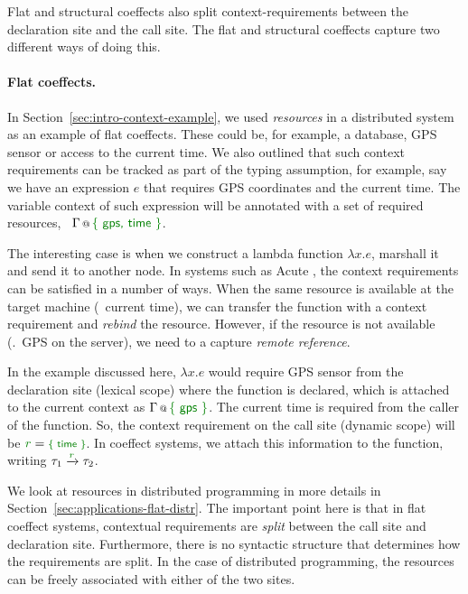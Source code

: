 Flat and structural coeffects also split context-requirements between the declaration site and 
the call site. The flat and structural coeffects capture two different ways of doing this.

\paragraph{Flat coeffects.}

In Section~\ref{sec:intro-context-example}, we used \emph{resources} in a distributed system as an 
example of flat coeffects. These could be, for example, a database, GPS sensor or access to the current 
time. We also outlined that such context requirements can be tracked as part of the typing assumption,
for example, say we have an expression $e$ that requires GPS coordinates and the current time. 
The variable context of such expression will be annotated with a set of required resources, 
\ie~$\coctx{\Gamma}{ \cclrd{\ident{\{ gps, time \}}} }$.

The interesting case is when we construct a lambda function $\lambda x.e$, marshall it and
send it to another node. In systems such as Acute \cite{app-distributed-acute}, the context 
requirements can be satisfied in a number of ways. When the same resource is available at the target
machine (\eg~current time), we can transfer the function with a context requirement and \emph{rebind} 
the resource. However, if the resource is not available (\eg.~GPS on the server), we need to a 
capture \emph{remote reference}.

In the example discussed here, $\lambda x.e$ would require GPS sensor from the declaration
site (lexical scope) where the function is declared, which is attached to the current context
as $\coctx{\Gamma}{ \cclrd{\ident{\{ gps \}}} }$. The current time is required from the caller
of the function. So, the context requirement on the call site (dynamic scope) will be
$\cclrd{r}=\cclrd{\footnotesize\ident{\{ time \}}}$. In coeffect systems, we attach this information
to the function, writing $\tau_1 \xrightarrow{ \cclrd{r} } \tau_2$.

We look at resources in distributed programming in more details in Section~\ref{sec:applications-flat-distr}.
The important point here is that in flat coeffect systems, contextual requirements are 
\emph{split} between the call site and declaration site. Furthermore, there is no syntactic
structure that determines how the requirements are split. In the case of distributed
programming, the resources can be freely associated with either of the two sites.

